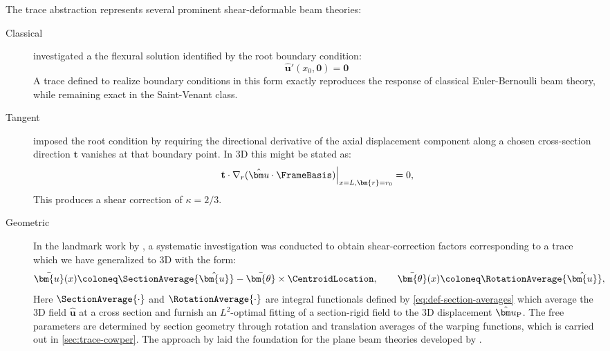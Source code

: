 The trace abstraction represents several prominent shear-deformable beam theories:
\begin{description}
    \item[Classical] \cite{timoshenko1987theory} investigated a the flexural solution identified by the root boundary condition:
    \[
    \hat{\bm u}'(x_0, \mathbf{0}) = \mathbf{0}
    \]
    A trace defined to realize boundary conditions in this form exactly reproduces the response of classical Euler-Bernoulli beam theory, while remaining exact in the Saint-Venant class.

    \item[Tangent] \cite{timoshenko1921correction} imposed the root condition by requiring the directional derivative of the axial displacement component along a chosen cross-section direction \(\mathbf{t}\) vanishes at that boundary point. 
    In 3D this might be stated as:
    $$
    \left.\mathbf{t} \cdot \nabla_r(\hat{\bm u} \cdot \FrameBasis)\right|_{x=L, \bm{r}=r_0}=0,
    $$
    This produces a shear correction of \(\kappa = 2/3\).
    \item[Geometric]  In the landmark work by \cite{cowper1966shear}, a systematic investigation was conducted to obtain shear-correction factors corresponding to a trace which we have generalized to 3D with the form:
    \begin{equation}
    \bar{\bm{u}}(x) \coloneq \SectionAverage{\hat{\bm{u}}} - \bar{\bm{\theta}} \times \CentroidLocation, 
    \qquad 
    \bar{\bm{\theta}}(x) \coloneq \RotationAverage{\hat{\bm{u}}},
    \label{eq:def-section-avg-trace}
    \end{equation}
    Here $\SectionAverage{\cdot}$ and $\RotationAverage{\cdot}$ are integral functionals defined by \eqref{eq:def-section-averages} which average the 3D field \(\hat{\bm u}\) at a cross section and furnish an $L^2$-optimal fitting of a section-rigid field to the 3D displacement \(\hat{\bm u}_{\rm P}\). 
    The free parameters are determined by section geometry through rotation and translation averages of the warping functions, which is carried out in \cref{sec:trace-cowper}.
    The approach by \cite{cowper1966shear} laid the foundation for the plane beam theories developed by \cite{simo1982bifurcation,hjelmstad1983seismic,hjelmstad1987warping}. 


\end{description}
